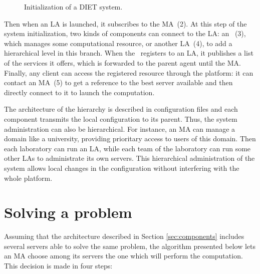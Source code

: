 \begin{figure}[hbt]
  \begin{center}
    \caption{Initialization of a DIET system.}
    \label{fig:init}
  \end{center}
\end{figure}

Then when an LA is launched, it subscribes to the MA~(2). At this step of the
system initialization, two kinds of components can connect to the LA: an
\sed ~(3), which manages some computational resource, or another LA~(4), to add a
hierarchical level in this branch. When the \sed\ registers to an LA, it
publishes a list of the services it offers, which is forwarded to the parent
agent until the MA.
Finally, any client can access the registered resource through the platform: it
can contact an MA~(5) to get a reference to the best server available and then
directly connect to it to launch the computation.

The architecture of the hierarchy is described in configuration files and each
component transmits the local configuration to its parent. Thus, the system
administration can also be hierarchical. For instance, an MA can manage a domain
like a university, providing prioritary access to users of this domain. Then
each laboratory can run an LA, while each team of the laboratory can run some
other LAs to administrate its own servers. This hierarchical administration of
the system allows local changes in the configuration without interfering with
the whole platform.



\section{Solving a problem}
\label{sec:solvepb}

Assuming that the architecture described in Section
\ref{sec:components} includes several servers able to solve the same
problem, the algorithm presented below lets an MA choose among its
servers the one which will perform the computation. This decision is
made in four steps:





